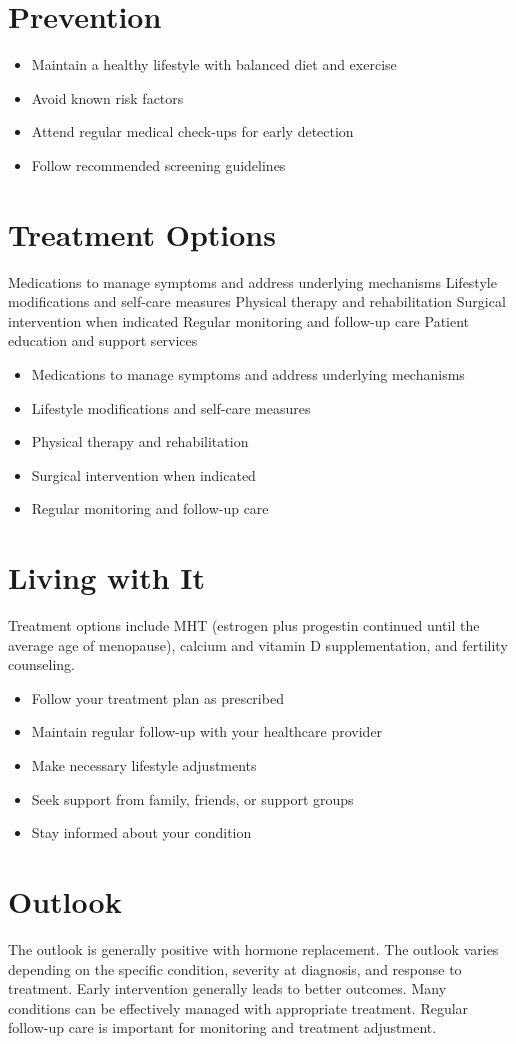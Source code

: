 \section{Prevention}
\begin{itemize}[noitemsep]
  \item Maintain a healthy lifestyle with balanced diet and exercise
  \item Avoid known risk factors
  \item Attend regular medical check-ups for early detection
  \item Follow recommended screening guidelines
\end{itemize}
\section{Treatment Options}
Medications to manage symptoms and address underlying mechanisms Lifestyle modifications and self-care measures Physical therapy and rehabilitation Surgical intervention when indicated Regular monitoring and follow-up care Patient education and support services

\begin{itemize}[noitemsep]
  \item Medications to manage symptoms and address underlying mechanisms
  \item Lifestyle modifications and self-care measures
  \item Physical therapy and rehabilitation
  \item Surgical intervention when indicated
  \item Regular monitoring and follow-up care
\end{itemize}
\section{Living with It}
Treatment options include MHT (estrogen plus progestin continued until the average age of menopause), calcium and vitamin D supplementation, and fertility counseling.

\begin{itemize}[noitemsep]
  \item Follow your treatment plan as prescribed
  \item Maintain regular follow-up with your healthcare provider
  \item Make necessary lifestyle adjustments
  \item Seek support from family, friends, or support groups
  \item Stay informed about your condition
\end{itemize}
\section{Outlook}
The outlook is generally positive with hormone replacement. The outlook varies depending on the specific condition, severity at diagnosis, and response to treatment. Early intervention generally leads to better outcomes. Many conditions can be effectively managed with appropriate treatment. Regular follow-up care is important for monitoring and treatment adjustment.
